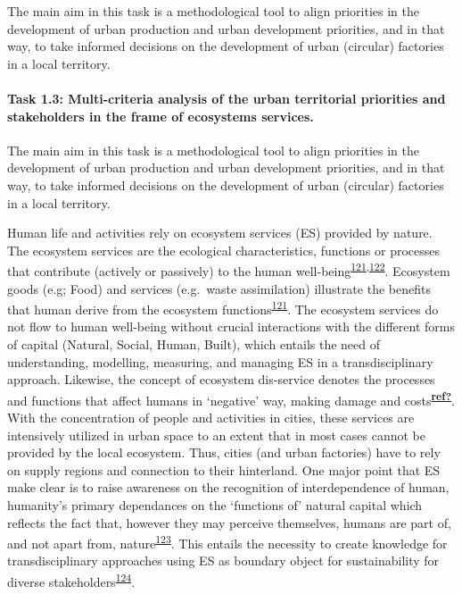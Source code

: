 \documentclass[
  12pt,
  a4paperpaper,
  onecolumn]{article}
\let\oldparagraph\paragraph
\renewcommand{\paragraph}[1]{\oldparagraph{#1}\mbox{}}
\let\paragraph\oldparagraph
\begin{document}
The main aim in this task is a methodological tool to align priorities
in the development of urban production and urban development priorities,
and in that way, to take informed decisions on the development of urban
(circular) factories in a local territory.

\hypertarget{task-1.3-multi-criteria-analysis-of-the-urban-territorial-priorities-and-stakeholders-in-the-frame-of-ecosystems-services.}{%
\paragraph{Task 1.3: Multi-criteria analysis of the urban territorial
priorities and stakeholders in the frame of ecosystems
services.}\label{task-1.3-multi-criteria-analysis-of-the-urban-territorial-priorities-and-stakeholders-in-the-frame-of-ecosystems-services.}}

The main aim in this task is a methodological tool to align priorities
in the development of urban production and urban development priorities,
and in that way, to take informed decisions on the development of urban
(circular) factories in a local territory.

Human life and activities rely on ecosystem services (ES) provided by
nature. The ecosystem services are the ecological characteristics,
functions or processes that contribute (actively or passively) to the
human
well-being\textsuperscript{\protect\hyperlink{ref-Costanza1997}{121},\protect\hyperlink{ref-Costanza2017}{122}}.
Ecosystem goods (e.g; Food) and services (e.g.~waste assimilation)
illustrate the benefits that human derive from the ecosystem
functions\textsuperscript{\protect\hyperlink{ref-Costanza1997}{121}}.
The ecosystem services do not flow to human well-being without crucial
interactions with the different forms of capital (Natural, Social,
Human, Built), which entails the need of understanding, modelling,
measuring, and managing ES in a transdisciplinary approach. Likewise,
the concept of ecosystem dis-service denotes the processes and functions
that affect humans in `negative' way, making damage and
costs\textsuperscript{\protect\hyperlink{ref-ref}{\textbf{ref?}}}. With
the concentration of people and activities in cities, these services are
intensively utilized in urban space to an extent that in most cases
cannot be provided by the local ecosystem. Thus, cities (and urban
factories) have to rely on supply regions and connection to their
hinterland. One major point that ES make clear is to raise awareness on
the recognition of interdependence of human, humanity's primary
dependances on the `functions of' natural capital which reflects the
fact that, however they may perceive themselves, humans are part of, and
not apart from,
nature\textsuperscript{\protect\hyperlink{ref-Ekins2003}{123}}. This
entails the necessity to create knowledge for transdisciplinary
approaches using ES as boundary object for sustainability for diverse
stakeholders\textsuperscript{\protect\hyperlink{ref-Honeck2021}{124}}.
\end{document}
